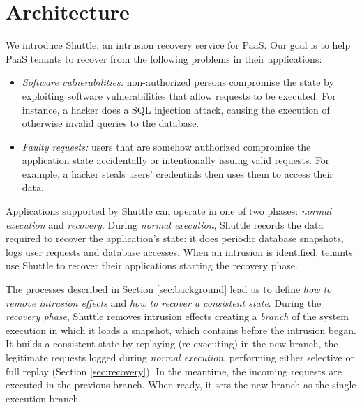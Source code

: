\documentclass[10pt,conference]{IEEEtran}
\begin{document}
\DIFaddend 
\section{Architecture}
\label{sec:architecture}

We introduce Shuttle, an intrusion recovery service for \ac{PaaS}. Our goal is to help \ac{PaaS} tenants to recover from the following problems in their applications:
\begin{itemize}
  \item \textit{Software vulnerabilities:} non-authorized persons compromise the state by exploiting software vulnerabilities that allow requests to be executed. For instance, a hacker does a SQL injection attack, causing the execution of otherwise invalid queries to the database.
  \item \textit{Faulty requests:} users that are somehow authorized compromise the application state accidentally or intentionally issuing valid requests. For example, a hacker steals users' credentials then uses them to access their data.
\end{itemize} 


Applications supported by Shuttle can operate in one of two phases: \textit{normal execution} and \textit{recovery}. During \emph{normal execution}, Shuttle records the data required to recover the application's state: it does periodic database snapshots, logs  user requests and database accesses. When an intrusion is identified, tenants use Shuttle to recover their applications starting the recovery phase.

The processes described in Section \ref{sec:background} lead us to define \textit{how to remove \DIFdelbegin {}\DIFdelend intrusion effects} and \textit{how to recover a consistent state}. During the \emph{recovery phase}, Shuttle removes  \DIFdelbegin {}\DIFdelend intrusion effects creating a \textit{branch} of the system execution in which it loads a snapshot, which contains \DIFdelbegin {}\DIFdelend \DIFaddbegin {}\DIFaddend before the intrusion began. It builds a consistent state by replaying (re-executing) in the new branch, the legitimate requests logged during \emph{normal execution}, performing either selective or full replay (Section \ref{sec:recovery}). In the meantime, the incoming requests are executed in the previous branch. When ready, it sets the new branch as the single execution branch.
\end{document}
